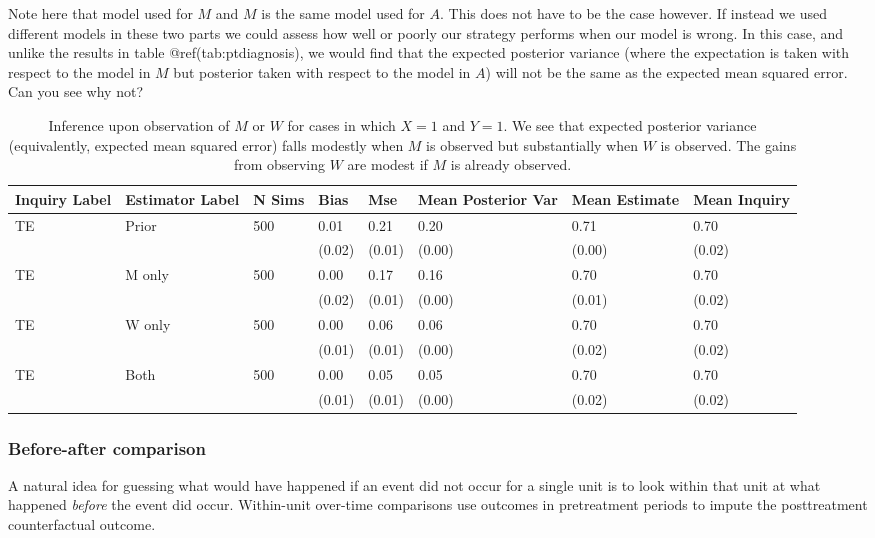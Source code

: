 \documentclass[
]{article}
\begin{document}
Note here that model used for \(M\) and \(M\) is the same model used for
\(A\). This does not have to be the case however. If instead we used
different models in these two parts we could assess how well or poorly
our strategy performs when our model is wrong. In this case, and unlike
the results in table @ref(tab:ptdiagnosis), we would find that the
expected posterior variance (where the expectation is taken with respect
to the model in \(M\) but posterior taken with respect to the model in
\(A\)) will not be the same as the expected mean squared error. Can you
see why not?

\begin{table}

\caption{\label{tab:ptdiagnosis}Inference upon observation of $M$ or $W$ for cases in which $X = 1$ and $Y = 1$. We see that expected posterior variance (equivalently, expected mean squared error) falls modestly when $M$ is observed but substantially when $W$ is observed. The gains from observing $W$ are modest if $M$ is already observed.}
\centering
\begin{tabular}[t]{l|l|l|l|l|l|l|l}
\hline
Inquiry Label & Estimator Label & N Sims & Bias & Mse & Mean Posterior Var & Mean Estimate & Mean Inquiry\\
\hline
TE & Prior & 500 & 0.01 & 0.21 & 0.20 & 0.71 & 0.70\\
\hline
 &  &  & (0.02) & (0.01) & (0.00) & (0.00) & (0.02)\\
\hline
TE & M only & 500 & 0.00 & 0.17 & 0.16 & 0.70 & 0.70\\
\hline
 &  &  & (0.02) & (0.01) & (0.00) & (0.01) & (0.02)\\
\hline
TE & W only & 500 & 0.00 & 0.06 & 0.06 & 0.70 & 0.70\\
\hline
 &  &  & (0.01) & (0.01) & (0.00) & (0.02) & (0.02)\\
\hline
TE & Both & 500 & 0.00 & 0.05 & 0.05 & 0.70 & 0.70\\
\hline
 &  &  & (0.01) & (0.01) & (0.00) & (0.02) & (0.02)\\
\hline
\end{tabular}
\end{table}

\hypertarget{before-after-comparison}{%
\subsubsection{Before-after comparison}\label{before-after-comparison}}

A natural idea for guessing what would have happened if an event did not
occur for a single unit is to look within that unit at what happened
\emph{before} the event did occur. Within-unit over-time comparisons use
outcomes in pretreatment periods to impute the posttreatment
counterfactual outcome.
\end{document}
